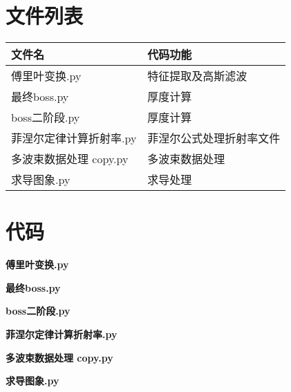 \documentclass[withoutpreface,bwprint]{cumcmthesis}
\begin{document}
\newpage
\begin{appendices}
\section{文件列表}
\begin{table}[H]
\centering
\begin{tabularx}{\textwidth}{LL}
\toprule
文件名  & 代码功能 \\

\midrule
傅里叶变换.py & 特征提取及高斯滤波 \\
最终boss.py & 厚度计算\\
boss二阶段.py & 厚度计算\\
菲涅尔定律计算折射率.py & 菲涅尔公式处理折射率文件\\
多波束数据处理 copy.py & 多波束数据处理\\
求导图象.py & 求导处理\\

\bottomrule
\end{tabularx}
\label{tab:文件列表}
\end{table}
\section{代码}

\noindent\textbf{傅里叶变换.py}


\noindent\textbf{最终boss.py}


\noindent\textbf{boss二阶段.py}


\noindent\textbf{菲涅尔定律计算折射率.py}


\noindent\textbf{多波束数据处理 copy.py}


\noindent\textbf{求导图象.py}


\end{appendices}
\end{document}
